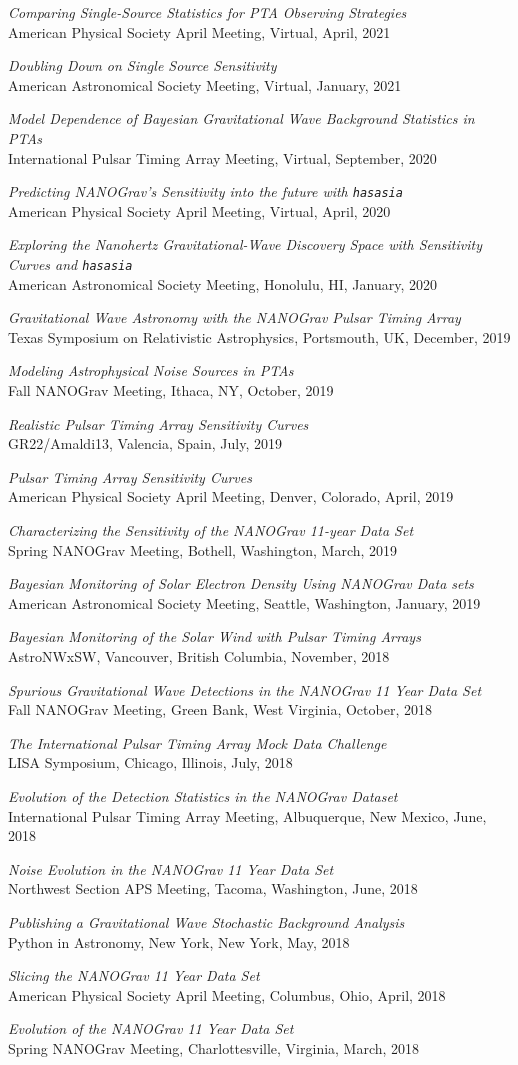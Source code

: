\documentclass[11pt,letterpaper,sans,unicode]{moderncv}
\newcommand{\talkitem}[3]{\item \textit{#1}\\{#2}, #3} %
\begin{document}
\renewcommand\labelenumi{\bfseries\theenumi .}
\begin{etaremune}[leftmargin=8mm]
\small
\talkitem{Comparing Single-Source Statistics for PTA Observing Strategies}{American Physical Society April Meeting}{Virtual, April, 2021}
\talkitem{Doubling Down on Single Source Sensitivity}{American Astronomical Society Meeting}{Virtual, January, 2021}
\talkitem{Model Dependence of Bayesian Gravitational Wave Background Statistics in PTAs}{International Pulsar Timing Array Meeting}{Virtual, September, 2020}
\talkitem{Predicting NANOGrav's Sensitivity into the future with \texttt{hasasia}}{American Physical Society April Meeting}{Virtual, April, 2020}
\talkitem{Exploring the Nanohertz Gravitational-Wave Discovery Space with Sensitivity Curves and \texttt{hasasia}}{American Astronomical Society Meeting}{Honolulu, HI, January, 2020}
\talkitem{Gravitational Wave Astronomy with the NANOGrav Pulsar Timing Array}{Texas Symposium on Relativistic Astrophysics}{Portsmouth, UK, December, 2019}
\talkitem{Modeling Astrophysical Noise Sources in PTAs}{Fall NANOGrav Meeting}{Ithaca, NY, October, 2019}
\talkitem{Realistic Pulsar Timing Array Sensitivity Curves}{GR22/Amaldi13}{Valencia, Spain, July, 2019}
\talkitem{Pulsar Timing Array Sensitivity Curves}{American Physical Society April Meeting}{Denver, Colorado, April, 2019}
\talkitem{Characterizing the Sensitivity of the NANOGrav 11-year Data Set}{Spring NANOGrav Meeting} Bothell, Washington, March, 2019
\talkitem{Bayesian Monitoring of Solar Electron Density Using NANOGrav Data sets}{American Astronomical Society Meeting}{Seattle, Washington, January, 2019}
\talkitem{Bayesian Monitoring of the Solar Wind with Pulsar Timing Arrays}{AstroNWxSW}{Vancouver, British Columbia, November, 2018}
\talkitem{Spurious Gravitational Wave Detections in the NANOGrav 11 Year Data Set}{Fall NANOGrav Meeting}{Green Bank, West Virginia, October, 2018}
\talkitem{The International Pulsar Timing Array Mock Data Challenge}{LISA Symposium} Chicago, Illinois, July, 2018
\talkitem{Evolution of the Detection Statistics in the NANOGrav Dataset}{International Pulsar Timing Array Meeting}{Albuquerque, New Mexico, June, 2018}
\talkitem{Noise Evolution in the NANOGrav 11 Year Data Set}{Northwest Section APS Meeting}{Tacoma, Washington, June, 2018}
\talkitem{Publishing a Gravitational Wave Stochastic Background Analysis}{Python in Astronomy}{New York, New York, May, 2018}
\talkitem{Slicing the NANOGrav 11 Year Data Set}{American Physical Society April Meeting}{Columbus, Ohio, April, 2018}
\talkitem{Evolution of the NANOGrav 11 Year Data Set}{Spring NANOGrav Meeting}{Charlottesville, Virginia, March, 2018}

\end{etaremune}
\end{document}
